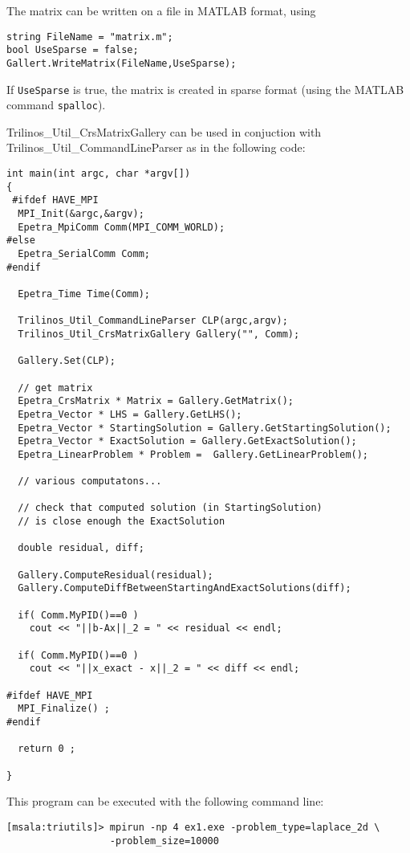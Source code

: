 The matrix can be written on a file in MATLAB format, using
\begin{verbatim}
string FileName = "matrix.m";
bool UseSparse = false;
Gallert.WriteMatrix(FileName,UseSparse);
\end{verbatim}
If \verb!UseSparse! is true, the matrix is created in sparse format
(using the MATLAB command \verb!spalloc!).

\medskip


\medskip

Trilinos\_Util\_CrsMatrixGallery can be used in conjuction with
Trilinos\_Util\_CommandLineParser as in the following code:
\begin{verbatim}
int main(int argc, char *argv[]) 
{
 #ifdef HAVE_MPI
  MPI_Init(&argc,&argv);
  Epetra_MpiComm Comm(MPI_COMM_WORLD);
#else
  Epetra_SerialComm Comm;
#endif

  Epetra_Time Time(Comm);

  Trilinos_Util_CommandLineParser CLP(argc,argv);
  Trilinos_Util_CrsMatrixGallery Gallery("", Comm);

  Gallery.Set(CLP);

  // get matrix
  Epetra_CrsMatrix * Matrix = Gallery.GetMatrix();
  Epetra_Vector * LHS = Gallery.GetLHS();
  Epetra_Vector * StartingSolution = Gallery.GetStartingSolution();
  Epetra_Vector * ExactSolution = Gallery.GetExactSolution();
  Epetra_LinearProblem * Problem =  Gallery.GetLinearProblem();

  // various computatons...

  // check that computed solution (in StartingSolution) 
  // is close enough the ExactSolution

  double residual, diff;

  Gallery.ComputeResidual(residual);
  Gallery.ComputeDiffBetweenStartingAndExactSolutions(diff);
  
  if( Comm.MyPID()==0 ) 
    cout << "||b-Ax||_2 = " << residual << endl;

  if( Comm.MyPID()==0 ) 
    cout << "||x_exact - x||_2 = " << diff << endl;

#ifdef HAVE_MPI
  MPI_Finalize() ;
#endif

  return 0 ;

}
\end{verbatim}
This program can be executed with the following command line:
\begin{verbatim}
[msala:triutils]> mpirun -np 4 ex1.exe -problem_type=laplace_2d \
                  -problem_size=10000
\end{verbatim}

